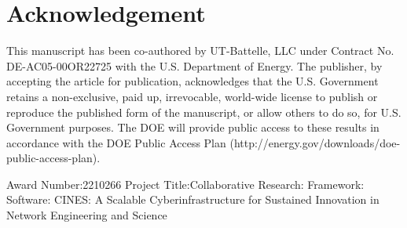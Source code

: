 \section*{Acknowledgement}

This manuscript has been co-authored by UT-Battelle, LLC under Contract No. DE-AC05-00OR22725 with the U.S. Department of Energy. The publisher, by accepting the article for publication, acknowledges that the U.S. Government retains a non-exclusive, paid up, irrevocable, world-wide license to publish or reproduce the published form of the manuscript, or allow others to do so, for U.S. Government purposes. The DOE will provide public access to these results in accordance with the DOE Public Access Plan (http://energy.gov/downloads/doe-public-access-plan).





Award Number:2210266
Project Title:Collaborative Research: Framework: Software: CINES: A Scalable Cyberinfrastructure for Sustained Innovation in Network Engineering and Science

